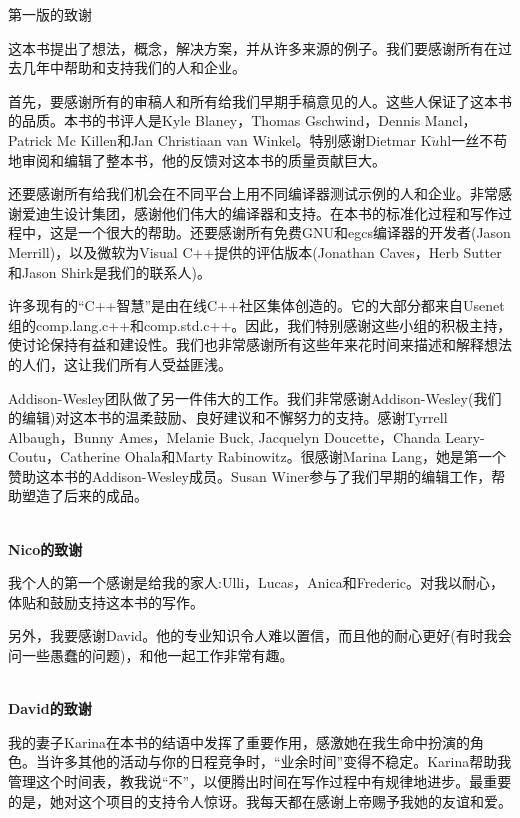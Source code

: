 \begin{flushright}
 第一版的致谢
\end{flushright}

这本书提出了想法，概念，解决方案，并从许多来源的例子。我们要感谢所有在过去几年中帮助和支持我们的人和企业。

首先，要感谢所有的审稿人和所有给我们早期手稿意见的人。这些人保证了这本书的品质。本书的书评人是Kyle Blaney，Thomas Gschwind，Dennis Mancl，Patrick Mc Killen和Jan Christiaan van Winkel。特别感谢Dietmar K$\ddot{u}$hl一丝不苟地审阅和编辑了整本书，他的反馈对这本书的质量贡献巨大。

还要感谢所有给我们机会在不同平台上用不同编译器测试示例的人和企业。非常感谢爱迪生设计集团，感谢他们伟大的编译器和支持。在本书的标准化过程和写作过程中，这是一个很大的帮助。还要感谢所有免费GNU和egcs编译器的开发者(Jason Merrill)，以及微软为Visual C++提供的评估版本(Jonathan Caves，Herb Sutter和Jason Shirk是我们的联系人)。

许多现有的“C++智慧”是由在线C++社区集体创造的。它的大部分都来自Usenet组的comp.lang.c++和comp.std.c++。因此，我们特别感谢这些小组的积极主持，使讨论保持有益和建设性。我们也非常感谢所有这些年来花时间来描述和解释想法的人们，这让我们所有人受益匪浅。

Addison-Wesley团队做了另一件伟大的工作。我们非常感谢Addison-Wesley(我们的编辑)对这本书的温柔鼓励、良好建议和不懈努力的支持。感谢Tyrrell Albaugh，Bunny Ames，Melanie Buck, Jacquelyn Doucette，Chanda Leary-Coutu，Catherine Ohala和Marty Rabinowitz。很感谢Marina Lang，她是第一个赞助这本书的Addison-Wesley成员。Susan Winer参与了我们早期的编辑工作，帮助塑造了后来的成品。

\hspace*{\fill} \\ %
\noindent\textbf{Nico的致谢}

我个人的第一个感谢是给我的家人:Ulli，Lucas，Anica和Frederic。对我以耐心，体贴和鼓励支持这本书的写作。

另外，我要感谢David。他的专业知识令人难以置信，而且他的耐心更好(有时我会问一些愚蠢的问题)，和他一起工作非常有趣。

\hspace*{\fill} \\ %
\noindent\textbf{David的致谢}

我的妻子Karina在本书的结语中发挥了重要作用，感激她在我生命中扮演的角色。当许多其他的活动与你的日程竞争时，“业余时间”变得不稳定。Karina帮助我管理这个时间表，教我说“不”，以便腾出时间在写作过程中有规律地进步。最重要的是，她对这个项目的支持令人惊讶。我每天都在感谢上帝赐予我她的友谊和爱。

